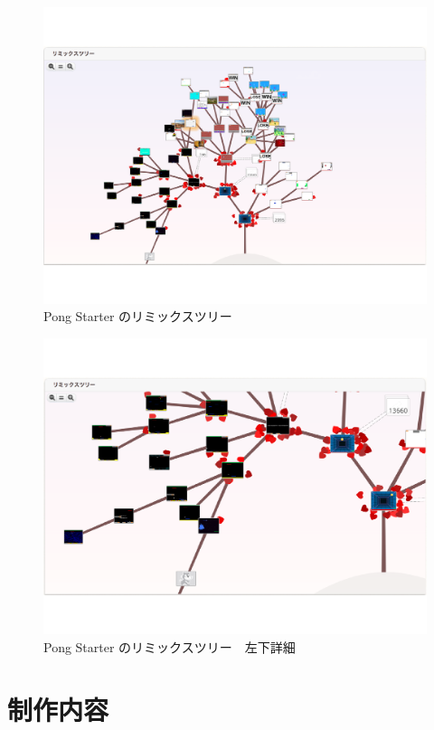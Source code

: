 \documentclass[a4paper,10pt,onecolumn,oneside,openany]{jsbook}
\begin{document}
\begin{figure}[ht]
  \centering
    \includegraphics[scale=0.5]{graphic/remixtree_all.pdf}
  \caption{Pong Starter のリミックスツリー}
 \end{figure}

\begin{figure}[hb]
  \centering
    \includegraphics[scale=0.5]{graphic/remixtree_detail.pdf}
  \caption{Pong Starter のリミックスツリー　左下詳細}
 \end{figure}
 
 


\chapter{制作内容}
\end{document}
